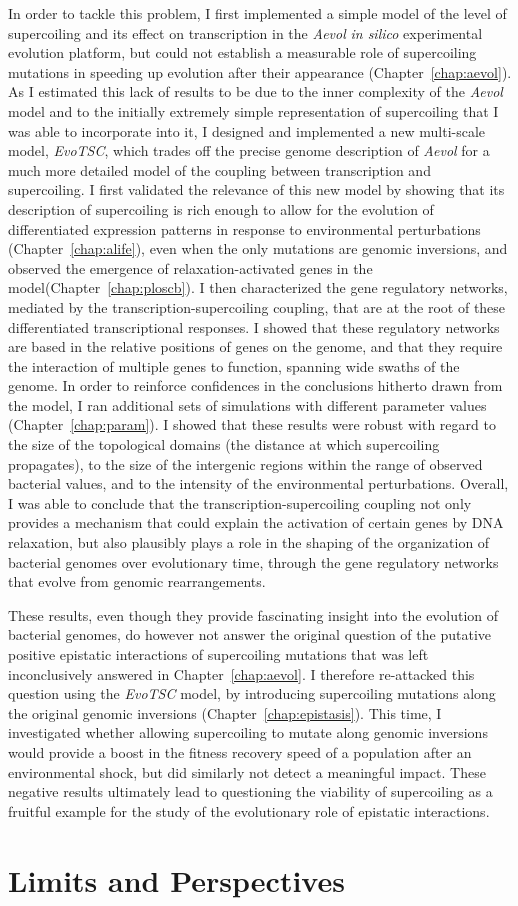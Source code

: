 In order to tackle this problem, I first implemented a simple model of the level of supercoiling and its effect on transcription in the \emph{Aevol} \emph{in silico} experimental evolution platform, but could not establish a measurable role of supercoiling mutations in speeding up evolution after their appearance (Chapter~\ref{chap:aevol}).
As I estimated this lack of results to be due to the inner complexity of the \emph{Aevol} model and to the initially extremely simple representation of supercoiling that I was able to incorporate into it, I designed and implemented a new multi-scale model, \emph{EvoTSC}, which trades off the precise genome description of \emph{Aevol} for a much more detailed model of the coupling between transcription and supercoiling.
I first validated the relevance of this new model by showing that its description of supercoiling is rich enough to allow for the evolution of differentiated expression patterns in response to environmental perturbations (Chapter~\ref{chap:alife}), even when the only mutations are genomic inversions, and observed the emergence of relaxation-activated genes in the model(Chapter~\ref{chap:ploscb}).
I then characterized the gene regulatory networks, mediated by the  transcription-supercoiling coupling, that are at the root of these differentiated transcriptional responses.
I showed that these regulatory networks are based in the relative positions of genes on the genome, and that they require the interaction of multiple genes to function, spanning wide swaths of the genome.
In order to reinforce confidences in the conclusions hitherto drawn from the model, I ran additional sets of simulations with different parameter values (Chapter~\ref{chap:param}).
I showed that these results were robust with regard to the size of the topological domains (the distance at which supercoiling propagates), to the size of the intergenic regions within the range of observed bacterial values, and to the intensity of the environmental perturbations.
Overall, I was able to conclude that the transcription-supercoiling coupling not only provides a mechanism that could explain the activation of certain genes by DNA relaxation, but also plausibly plays a role in the shaping of the organization of bacterial genomes over evolutionary time, through the gene regulatory networks that evolve from genomic rearrangements.

These results, even though they provide fascinating insight into the evolution of bacterial genomes, do however not answer the original question of the putative positive epistatic interactions of supercoiling mutations that was left inconclusively answered in Chapter~\ref{chap:aevol}.
I therefore re-attacked this question using the \emph{EvoTSC} model, by introducing supercoiling mutations along the original genomic inversions (Chapter~\ref{chap:epistasis}).
This time, I investigated whether allowing supercoiling to mutate along genomic inversions would provide a boost in the fitness recovery speed of a population after an environmental shock, but did similarly not detect a meaningful impact.
These negative results ultimately lead to questioning the viability of supercoiling as a fruitful example for the study of the evolutionary role of epistatic interactions.

\section{Limits and Perspectives}

